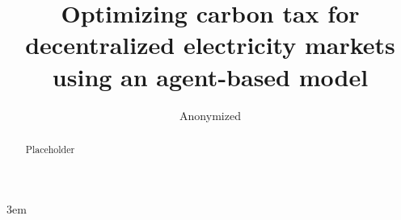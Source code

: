 \documentclass[sigconf]{acmart}
\begin{document}
\emergencystretch 3em

\title{Optimizing carbon tax for decentralized electricity markets using an agent-based model}

%
%
\author{Anonymized}
\renewcommand{\shortauthors}{Anonymized}

\begin{abstract}
 
 Placeholder
 
\end{abstract}




\end{document}
